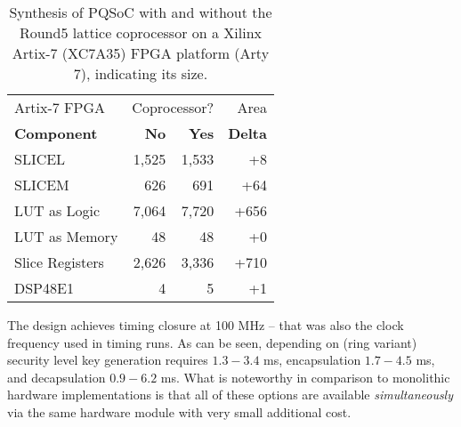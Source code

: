 \documentclass[a4paper]{article}
\begin{document}
\begin{table}
\begin{center}

    \begin{tabular}{| l | r r r |}
    \hline
    Artix-7 FPGA    & \multicolumn{2}{r}{Coprocessor?} & Area \\
    {\bf Component} & {\bf No } & {\bf Yes} & {\bf Delta} \\
    \hline
    SLICEL          & 1,525     & 1,533     & +8    \\
    SLICEM          &   626     &   691     & +64   \\
    LUT as Logic    & 7,064     & 7,720     & +656  \\
    LUT as Memory   &    48     &    48     & +0    \\
    Slice Registers & 2,626     & 3,336     & +710  \\
    DSP48E1         &     4     &     5     & +1    \\
    \hline
\end{tabular}
    \caption{Synthesis of PQSoC with and without the Round5 lattice
    coprocessor on a Xilinx Artix-7 (XC7A35) FPGA platform (Arty 7),
    indicating its size.}
    \label{tab:fpgasize}
\end{center}
\end{table}

The design achieves timing closure at 100 MHz -- that was also the clock
frequency used in timing runs. As can be seen, depending on (ring variant)
security level key generation requires $1.3 - 3.4$ ms,
encapsulation $1.7 - 4.5$ ms, and decapsulation
$0.9 - 6.2$ ms. What is noteworthy in comparison to monolithic
hardware implementations is that all of these options are available
\emph{simultaneously} via the same hardware module with very small additional
cost.
\end{document}
